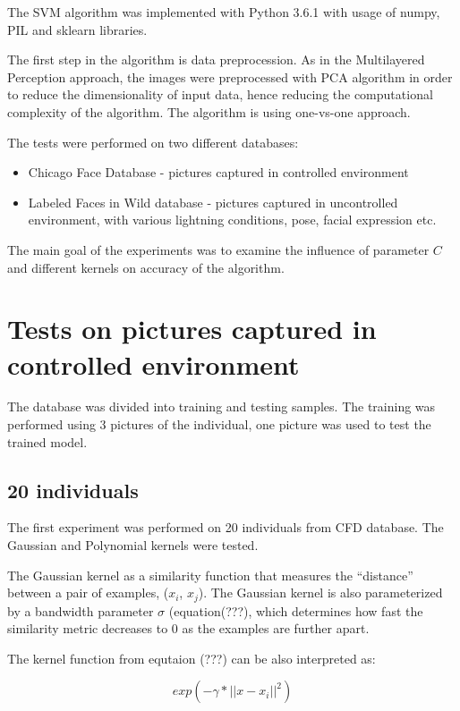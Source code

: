 The SVM algorithm was implemented with Python 3.6.1 with usage of numpy, PIL and sklearn libraries. 

The first step in the algorithm is data preprocession. As in the Multilayered Perception approach, the images were preprocessed with PCA algorithm in order to reduce the dimensionality of input data, hence reducing the computational complexity of the algorithm. The algorithm is using one-vs-one approach.

The tests were performed on two different databases: 
\begin{itemize}
\itemsep0em 
\item Chicago Face Database - pictures captured in controlled environment
\item Labeled Faces in Wild database - pictures captured in uncontrolled environment, with various lightning conditions, pose, facial expression etc. 
\end{itemize}

The main goal of the experiments was to examine the influence of parameter $C$ and different kernels on accuracy of the algorithm.

\section{Tests on pictures captured in controlled environment}

The database was divided into training and testing samples. The training was performed using 3 pictures of the individual, one picture was used to test the trained model. 

\subsection{20 individuals}

The first experiment was performed on 20 individuals from CFD database. 
The Gaussian and Polynomial kernels were tested. 

The Gaussian kernel as a similarity function that measures the “distance” between a pair of examples, ($x_{i}$, $x_{j}$). The Gaussian kernel is also parameterized by a bandwidth parameter $\sigma$ (equation(???), which determines how fast the similarity metric decreases to 0 as the examples are further apart. 

The kernel function from equtaion (???) can be also interpreted as:

\begin{equation}
exp(-\gamma * ||x-x_{i}||^2)
\end{equation}

